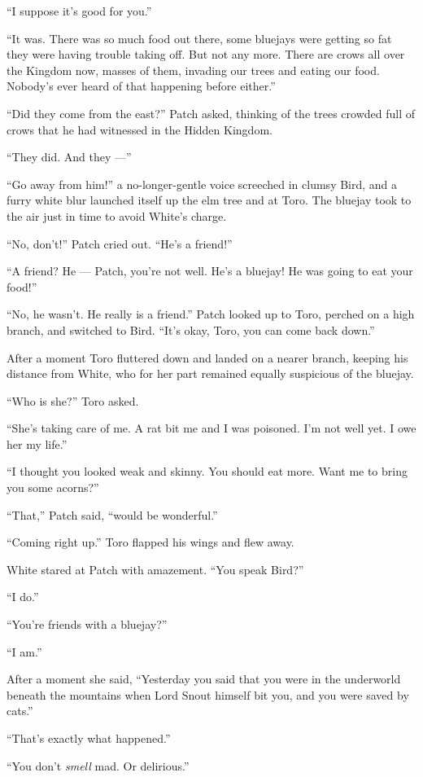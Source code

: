 \documentclass[ebook,oneside,openany,17pt]{memoir}
\begin{document}
“I suppose it’s good for you.”

“It was. There was so much food out there, some bluejays were getting
so fat they were having trouble taking off. But not any more. There
are crows all over the Kingdom now, masses of them, invading our trees
and eating our food. Nobody’s ever heard of that happening before
either.”

“Did they come from the east?” Patch asked, thinking of the trees
crowded full of crows that he had witnessed in the Hidden Kingdom.

“They did. And they —”

“Go away from him!” a no-longer-gentle voice screeched in clumsy Bird,
and a furry white blur launched itself up the elm tree and at
Toro. The bluejay took to the air just in time to avoid White’s
charge.

“No, don’t!” Patch cried out. “He’s a friend!”

“A friend? He — Patch, you’re not well. He’s a bluejay! He was going
to eat your food!”

“No, he wasn’t. He really is a friend.” Patch looked up to Toro,
perched on a high branch, and switched to Bird. “It’s okay, Toro, you
can come back down.”

After a moment Toro fluttered down and landed on a nearer branch,
keeping his distance from White, who for her part remained equally
suspicious of the bluejay.

“Who is she?” Toro asked.

“She’s taking care of me. A rat bit me and I was poisoned. I’m not
well yet. I owe her my life.”

“I thought you looked weak and skinny. You should eat more. Want me to
bring you some acorns?”

“That,” Patch said, “would be wonderful.”

“Coming right up.” Toro flapped his wings and flew away.

White stared at Patch with amazement. “You speak Bird?”

“I do.”

“You’re friends with a bluejay?”

“I am.”

After a moment she said, “Yesterday you said that you were in the
underworld beneath the mountains when Lord Snout himself bit you, and
you were saved by cats.”

“That’s exactly what happened.”

“You don’t \emph{smell} mad. Or delirious.”
\end{document}
